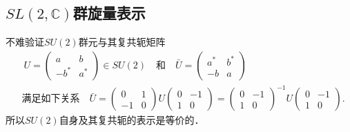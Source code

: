 \subsection{$SL(2,\mathbb{C})$群旋量表示}\label{chlar:sec_sl2rep}


不难验证$SU(2)$群元与其复共轭矩阵
\begin{align*}
    &\ U=\begin{pmatrix} a & b \\ -b^* & a^* \end{pmatrix} \in SU(2)
    \quad \text{和}\quad  \bar{U}=
    \begin{pmatrix} a^* & b^* \\ -b & a \end{pmatrix}  \\
&\text{满足如下关系}\quad
    \bar{U}=\begin{pmatrix} 0 & 1 \\ -1 & 0 \end{pmatrix} U
    \begin{pmatrix} 0 & -1 \\ 1 & 0 \end{pmatrix}
    =\begin{pmatrix} 0 & -1 \\ 1 & 0 \end{pmatrix}^{-1} U    
    \begin{pmatrix} 0 & -1 \\ 1 & 0 \end{pmatrix} .
\end{align*}
所以$SU(2)$自身及其复共轭的表示是等价的．

